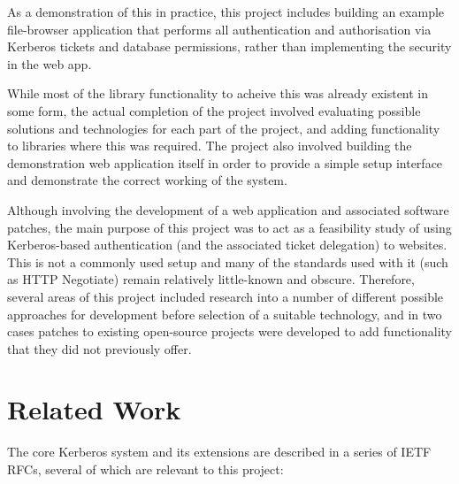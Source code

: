 \documentclass{report}
\begin{document}
As a demonstration of this in practice, this project includes building an example file-browser application that performs all authentication and authorisation via Kerberos tickets and database permissions, rather than implementing the security in the web app.

While most of the library functionality to acheive this was already existent in some form, the actual completion of the project involved evaluating possible solutions and technologies for each part of the project, and adding functionality to libraries where this was required. The project also involved building the demonstration web application itself in order to provide a simple setup interface and demonstrate the correct working of the system.

Although involving the development of a web application and associated software patches, the main purpose of this project was to act as a feasibility study of using Kerberos-based authentication (and the associated ticket delegation) to websites. This is not a commonly used setup and many of the standards used with it (such as HTTP Negotiate) remain relatively little-known and obscure. Therefore, several areas of this project included research into a number of different possible approaches for development before selection of a suitable technology, and in two cases patches to existing open-source projects were developed to add functionality that they did not previously offer.

\section{Related Work}
The core Kerberos system and its extensions are described in a series of IETF RFCs, several of which are relevant to this project:
\end{document}
